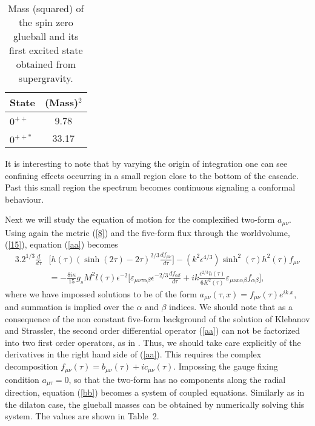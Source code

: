\documentclass[12pt,epsf,a4paper]{article}
\begin{document}
\begin{table}[hbt]
\centering

\begin{tabular}{|l|c|}     \hline\hline
   {\bf State} &  {\bf (Mass)$^2$} \\ \hline
   $0^{++}$    &  9.78 \\
   $0^{++*}$   &  33.17 \\
    \hline\hline
\end{tabular}

\caption{Mass (squared) of the spin zero glueball and its first 
excited state obtained from supergravity.}

\label{tab1}
\end{table}
  
It is interesting to note that by varying the origin of integration one
can see confining effects occurring in a small region close to 
the bottom of the cascade. Past this small region the spectrum 
becomes continuous signaling a conformal behaviour. 
  
Next we will study the equation of motion for the complexified two-form $a_{\mu \nu}$. 
Using again the metric 
(\ref{8}) and the five-form flux through the worldvolume, (\ref{15}), 
equation (\ref{aa}) becomes 
\begin{equation}
\begin{split}
3.2^{1/3}  
\frac {d}{d \tau} &\Big[ h(\tau) (\sinh(2 \tau) -2 \tau)^{2/3} \frac {d f_{\mu \nu}} 
{d \tau} \Big] - (k^2 \epsilon^{4/3}) \sinh^2 (\tau) h^2(\tau) f_{\mu \nu} \\
&= - \frac {8 i \kappa}{15} g_s M^2 l(\tau) \epsilon^{-2} \Big[ \varepsilon_{\mu \nu \tau \alpha 
\beta} \epsilon^{-2/3} \frac {d f_{\alpha \beta}}{d \tau} + 
i k \frac {\epsilon^{2/3} h(\tau) }{6 K^2(\tau)}
\varepsilon_{\mu \nu x \alpha \beta} f_{\alpha \beta} \Big],
\label{bb}
\end{split}
\end{equation}
where we have impossed solutions to be of the form $a_{\mu \nu} (\tau,x) = 
f_{\mu \nu}(\tau) e^{ik.x}$, and summation is implied over the $\alpha$ and 
$\beta$ indices. We should note that as a consequence of the non constant 
five-form background of the solution of Klebanov and Strassler, the second order 
differential operator (\ref{aa}) can not be factorized into two first order 
operators, as in \cite{hs}. Thus, we should take care explicitly of the derivatives 
in the right hand side of (\ref{aa}). This requires the complex decomposition 
$f_{\mu \nu} (\tau) = b_{\mu \nu} (\tau) + i c_{\mu \nu} (\tau)$. Impossing the gauge fixing 
condition $a_{\mu \tau} =0$, so that the two-form has no components along the 
radial direction, equation (\ref{bb}) becomes 
a system of coupled equations. Similarly as in the dilaton case, the glueball masses 
can be obtained by numerically solving this system. The values are shown in Table~2.
\end{document}
